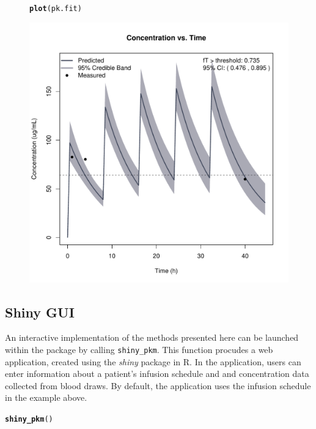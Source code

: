 \documentclass{article}\usepackage[]{graphicx}\usepackage[]{color}
\makeatletter
\def\maxwidth{ %
  \ifdim\Gin@nat@width>\linewidth
    \linewidth
  \else
    \Gin@nat@width
  \fi
}
\newcommand{\hlstd}[1]{\textcolor[rgb]{0.345,0.345,0.345}{#1}}%
\newcommand{\hlkwd}[1]{\textcolor[rgb]{0.737,0.353,0.396}{\textbf{#1}}}%
\newenvironment{kframe}{%
 \def\at@end@of@kframe{}%
 \ifinner\ifhmode%
  \def\at@end@of@kframe{\end{minipage}}%
  \begin{minipage}{\columnwidth}%
 \fi\fi%
 \def\FrameCommand##1{\hskip\@totalleftmargin \hskip-\fboxsep
 \colorbox{shadecolor}{##1}\hskip-\fboxsep
     \hskip-\linewidth \hskip-\@totalleftmargin \hskip\columnwidth}%
 \MakeFramed {\advance\hsize-\width
   \@totalleftmargin\z@ \linewidth\hsize
   \@setminipage}}%
 {\par\unskip\endMakeFramed%
 \at@end@of@kframe}
\newenvironment{knitrout}{}{} %
\makeatother
\begin{document}
\begin{figure}
\begin{knitrout}
\color{fgcolor}\begin{kframe}
\begin{alltt}
\hlkwd{plot}\hlstd{(pk.fit)}
\end{alltt}
\end{kframe}
\includegraphics[width=\maxwidth]{figure/unnamed-chunk-14-1} 

\end{knitrout}
\end{figure}

\subsection{Shiny GUI}

An interactive implementation of the methods presented here can be launched within the package by calling \texttt{shiny_pkm}. This function procudes a web application, created using the {\it shiny} package in R. In the application, users can enter information about a patient's infusion schedule and and concentration data collected from blood draws. By default, the application uses the infusion schedule in the example above.

\begin{knitrout}
\color{fgcolor}\begin{kframe}
\begin{alltt}
\hlkwd{shiny_pkm}\hlstd{()}
\end{alltt}
\end{kframe}
\end{knitrout}

\end{document}
